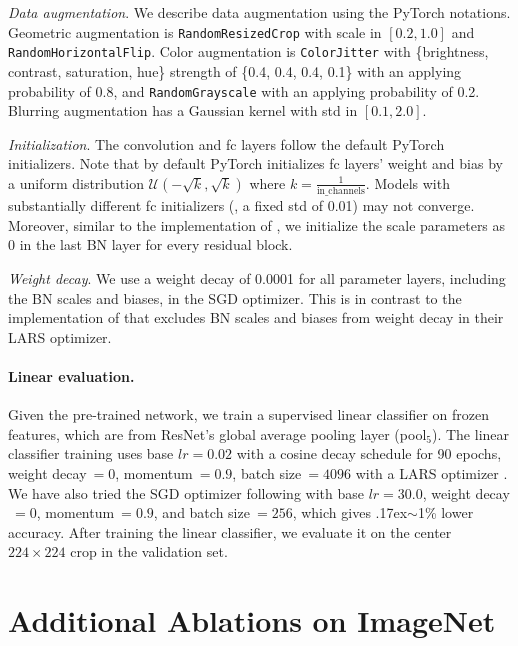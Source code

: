 \documentclass[final]{cvpr}
\newcommand{\app}{\raise.17ex\hbox{$\scriptstyle\sim$}}
\begin{document}
\emph{Data augmentation}. We describe data augmentation using the PyTorch \cite{Paszke2019} notations. Geometric augmentation is \texttt{RandomResizedCrop} with scale in $[0.2, 1.0]$ \cite{Wu2018a} and \texttt{RandomHorizontalFlip}. Color augmentation is \texttt{ColorJitter} with \{brightness, contrast, saturation, hue\} strength of \{0.4, 0.4, 0.4, 0.1\} with an applying probability of 0.8, and \texttt{RandomGrayscale} with an applying probability of 0.2. Blurring augmentation \cite{Chen2020} has a Gaussian kernel with std in $[0.1, 2.0]$.

\emph{Initialization}. The convolution and fc layers follow the default PyTorch initializers. Note that by default PyTorch initializes fc layers' weight and bias by a uniform distribution $\mathcal{U}(-\sqrt{k}, \sqrt{k})$ where $k{=}\frac{1}{\text{in\_channels}}$. Models with substantially different fc initializers (\eg, a fixed std of 0.01) may not converge. Moreover, similar to the implementation of \cite{Chen2020}, we initialize the scale parameters as 0 \cite{Goyal2017} in the last BN layer for every residual block.

\emph{Weight decay}. We use a weight decay of 0.0001 for all parameter layers, including the BN scales and biases, in the SGD optimizer. This is in contrast to the implementation of \cite{Chen2020,Grill2020} that excludes BN scales and biases from weight decay in their LARS optimizer.

\paragraph{Linear evaluation.} Given the pre-trained network, we train a supervised linear classifier on frozen features, which are from ResNet's global average pooling layer (pool$_5$). 
The linear classifier training uses base $lr\!=\!0.02$ with a cosine decay schedule for 90 epochs, weight decay$~\!=\!0$, momentum$~\!=\!0.9$, batch size$~\!=\!4096$ with a LARS optimizer \cite{You2017}. We have also tried the SGD optimizer following \cite{He2019a} with base $lr\!=\!30.0$, weight decay$~\!=\!0$, momentum$~\!=\!0.9$, and batch size$~\!=\!256$, which gives \app1\% lower accuracy.
After training the linear classifier, we evaluate it on the center $224{\times}224$ crop in the validation set.

\section{Additional Ablations on ImageNet} \label{subsec:sensitivity}
\end{document}

